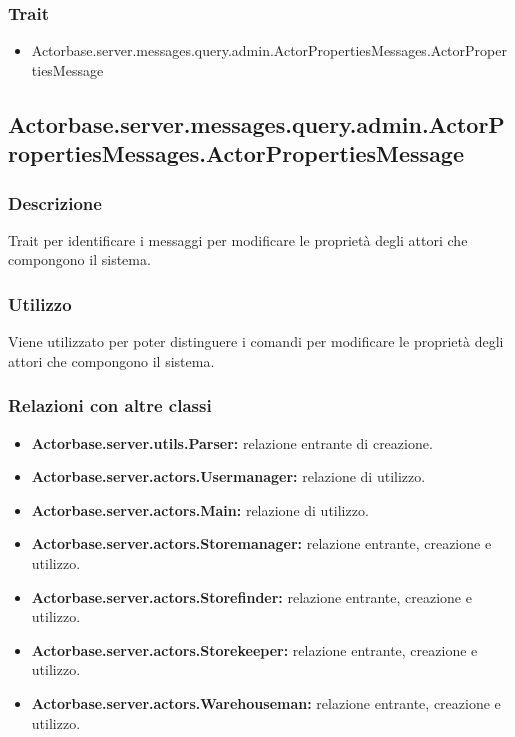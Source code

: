 \documentclass[a4paper]{article}
\begin{document}
			\subsubsection{Trait}
				\begin{itemize}
					\item Actorbase.server.messages.query.admin.ActorPropertiesMessages.ActorPropertiesMessage
				\end{itemize}
		
		\subsection{Actorbase.server.messages.query.admin.ActorPropertiesMessages.ActorPropertiesMessage}
			\subsubsection{Descrizione}
				Trait per identificare i messaggi per modificare le proprietà degli attori che compongono il sistema.
				
			\subsubsection{Utilizzo}
				Viene utilizzato per poter distinguere i comandi per modificare le proprietà degli attori che compongono il sistema.
				
			\subsubsection{Relazioni con altre classi}
				\begin{itemize}
					\item \textbf{Actorbase.server.utils.Parser:} relazione entrante di creazione.
					\item \textbf{Actorbase.server.actors.Usermanager:} relazione di utilizzo.
					\item \textbf{Actorbase.server.actors.Main:} relazione di utilizzo.
					\item \textbf{Actorbase.server.actors.Storemanager:} relazione entrante, creazione e utilizzo.
					\item \textbf{Actorbase.server.actors.Storefinder:} relazione entrante, creazione e utilizzo.
					\item \textbf{Actorbase.server.actors.Storekeeper:} relazione entrante, creazione e utilizzo.
					\item \textbf{Actorbase.server.actors.Warehouseman:} relazione entrante, creazione e utilizzo.
				\end{itemize}
\end{document}
